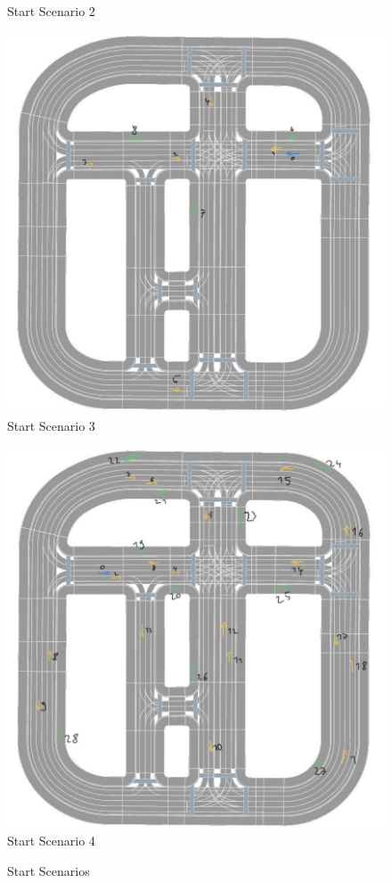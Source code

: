 \begin{figure}[ht]
\begin{minipage}[b]{0.43\linewidth}
		Start Scenario 2
	\end{minipage} 
	\begin{minipage}[b]{0.43\linewidth}
		\centering
		\includegraphics[width=1\linewidth]{figures/start_scenarios/scenario_v4} 
		Start Scenario 3
	\end{minipage}%
	\begin{minipage}[b]{0.43\linewidth}
		\centering
		\includegraphics[width=1\linewidth]{figures/start_scenarios/scenario_v5} 
		Start Scenario 4
	\end{minipage} 
	\caption{Start Scenarios}
	\label{fig:appendix:start_scenarios} 
\end{figure}


